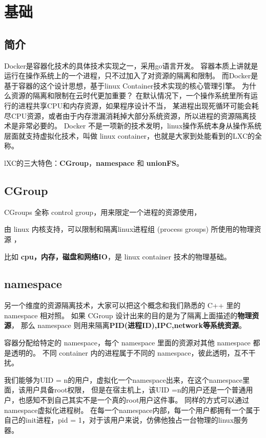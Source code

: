 \chapter{基础}
\newpage

\section{简介}

Docker是容器化技术的具体技术实现之一，采用go语言开发。
容器本质上讲就是运行在操作系统上的一个进程，只不过加入了对资源的隔离和限制。
而Docker是基于容器的这个设计思想，基于linux Container技术实现的核心管理引擎。
为什么资源的隔离和限制在云时代更加重要？
在默认情况下，一个操作系统里所有运行的进程共享CPU和内存资源，如果程序设计不当，
某进程出现死循环可能会耗尽CPU资源，或者由于内存泄漏消耗掉大部分系统资源，所以进程的资源隔离技术是非常必要的。
Docker 不是一项新的技术发明，linux操作系统本身从操作系统层面就支持虚拟化技术，叫做 linux container，也就是大家到处能看到的LXC的全称。

lXC的三大特色：\textbf{CGroup}，\textbf{namespace} 和 \textbf{unionFS}。

\section{CGroup}

CGroups 全称 control group，用来限定一个进程的资源使用，

由 linux 内核支持，可以限制和隔离linux进程组 (process groups) 所使用的物理资源 ，

比如 \textbf{cpu，内存，磁盘和网络IO}，是 linux container 技术的物理基础。

\section{namespace}

另一个维度的资源隔离技术，大家可以把这个概念和我们熟悉的 C++ 里的 namespace 相对照。
如果 CGroup 设计出来的目的是为了隔离上面描述的\textbf{物理资源}，
那么 namespace 则用来隔离\textbf{PID(进程ID),IPC,network等系统资源}。

容器分配给特定的 namespace，每个 namespace 里面的资源对其他 namespace 都是透明的。
不同 container 内的进程属于不同的 namespace，彼此透明，互不干扰。

我们能够为UID = n的用户，虚拟化一个namespace出来，在这个namespace里面，该用户具备root权限，
但是在宿主机上，该UID =n的用户还是一个普通用户，也感知不到自己其实不是一个真的root用户这件事。
同样的方式可以通过namespace虚拟化进程树。
在每一个namespace内部，每一个用户都拥有一个属于自己的init进程，pid = 1，对于该用户来说，仿佛他独占一台物理的linux服务器。

